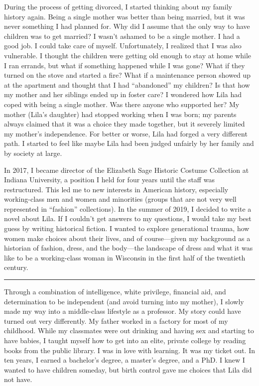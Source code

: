 \documentclass[
  american,
  letterpaper,
]{book}
\begin{document}
During the process of getting divorced, I started thinking about my
family history again. Being a single mother was better than being
married, but it was never something I had planned for. Why did I assume
that the only way to have children was to get married? I wasn't ashamed
to be a single mother. I had a good job. I could take care of myself.
Unfortunately, I realized that I was also vulnerable. I thought the
children were getting old enough to stay at home while I ran errands,
but what if something happened while I was gone? What if they turned on
the stove and started a fire? What if a maintenance person showed up at
the apartment and thought that I had ``abandoned'' my children? Is that
how my mother and her siblings ended up in foster care? I wondered how
Lila had coped with being a single mother. Was there anyone who
supported her? My mother (Lila's daughter) had stopped working when I
was born; my parents always claimed that it was a choice they made
together, but it severely limited my mother's independence. For better
or worse, Lila had forged a very different path. I started to feel like
maybe Lila had been judged unfairly by her family and by society at
large.

In 2017, I became director of the Elizabeth Sage Historic Costume
Collection at Indiana University, a position I held for four years until
the staff was restructured. This led me to new interests in American
history, especially working-class men and women and minorities (groups
that are not very well represented in ``fashion'' collections). In the
summer of 2019, I decided to write a novel about Lila. If I couldn't get
answers to my questions, I would take my best guess by writing
historical fiction. I wanted to explore generational trauma, how women
make choices about their lives, and of course---given my background as a
historian of fashion, dress, and the body---the landscape of dress and
what it was like to be a working-class woman in Wisconsin in the first
half of the twentieth century.

\begin{center}\rule{0.5\linewidth}{0.5pt}\end{center}

Through a combination of intelligence, white privilege, financial aid,
and determination to be independent (and avoid turning into my mother),
I slowly made my way into a middle-class lifestyle as a professor. My
story could have turned out very differently. My father worked in a
factory for most of my childhood. While my classmates were out drinking
and having sex and starting to have babies, I taught myself how to get
into an elite, private college by reading books from the public library.
I was in love with learning. It was my ticket out. In ten years, I
earned a bachelor's degree, a master's degree, and a PhD. I knew I
wanted to have children someday, but birth control gave me choices that
Lila did not have.
\end{document}
